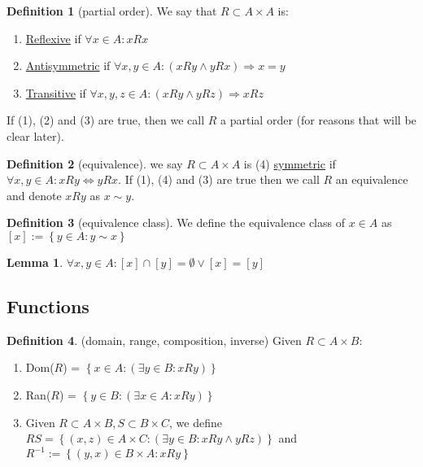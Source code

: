 \documentclass{article}
\renewcommand\O{\ensuremath{\emptyset}}
\newtheorem{lemma}[theorem]{Lemma}
\theoremstyle{definition}
\newtheorem{definition}{Definition}[subsection]
\theoremstyle{remark}
\theoremstyle{plain}
\begin{document}
\begin{definition}[partial order]
    We say that \(R\subset A\times A \) is:
    \begin{enumerate}
        \item \underline{Reflexive} if \(\forall x \in A: xRx\)
        \item \underline{Antisymmetric} if \(\forall x,y \in A : (xRy \land yRx) \Rightarrow x = y\)
        \item \underline{Transitive} if \(\forall x,y,z \in A : (xRy \land yRz) \Rightarrow xRz\)
    \end{enumerate}

    If (1), (2) and (3) are true, then we call \(R\) a partial order (for reasons that will be clear later).
\end{definition}

\begin{definition}[equivalence]
    we say \(R \subset A\times A\) is (4) \underline{symmetric} if \(\forall x,y \in A: xRy \iff yRx\). If (1), (4) and (3) are true then we call \(R\) an equivalence and denote \(xRy\) as \(x\sim y\).
\end{definition}

\begin{definition}[equivalence class]
    We define the equivalence class of \(x\in A\) as \([x]:= \left\{ y \in A: y\sim x \right\}\)
\end{definition}

\begin{lemma}
    \(\forall x,y \in A: [x]\cap[y] = \O \lor [x] = [y]\)
\end{lemma}

\subsection{Functions}

\begin{definition}(domain, range, composition, inverse)
    Given \(R \subset A\times B\):
    \begin{enumerate}
        \item Dom($R$) = \(\left\{ x\in A: (\exists y\in B: xRy) \right\}\)
        \item Ran(\(R\)) = \(\left\{ y\in B: (\exists x\in A : xRy) \right\}\)
        \item Given \(R\subset A\times B, S\subset B\times C\), we define \(RS = \left\{ (x,z)\in A\times C: (\exists y\in B : xRy \land yRz) \right\}\) and \(R^{-1}:=\left\{ (y,x)\in B\times A: xRy \right\}\)
    \end{enumerate}
\end{definition}
\end{document}
